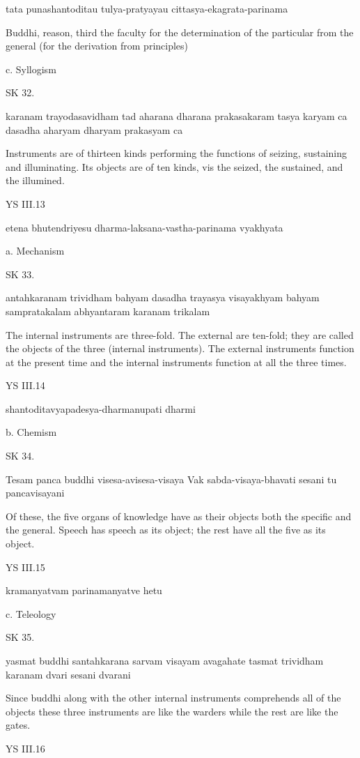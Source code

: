 tata punashantoditau tulya-pratyayau cittasya-ekagrata-parinama

Buddhi, reason, third the faculty for the determination of
the particular from the general (for the derivation from principles)

c. Syllogism

SK 32.

karanam trayodasavidham tad aharana dharana prakasakaram
tasya karyam ca dasadha aharyam dharyam prakasyam ca

Instruments are of thirteen kinds performing the functions of
seizing, sustaining and illuminating.
Its objects are of ten kinds, vis
the seized, the sustained, and the illumined.

YS III.13

etena bhutendriyesu dharma-laksana-vastha-parinama vyakhyata

a. Mechanism

SK 33.

antahkaranam trividham bahyam dasadha trayasya visayakhyam
bahyam sampratakalam abhyantaram karanam trikalam

The internal instruments are three-fold.
The external are ten-fold;
they are called the objects of the three (internal instruments).
The external instruments function at the present time and
the internal instruments function at all the three times.

YS III.14

shantoditavyapadesya-dharmanupati dharmi

b. Chemism

SK 34.

Tesam panca buddhi visesa-avisesa-visaya
Vak sabda-visaya-bhavati sesani tu pancavisayani

Of these, the five organs of knowledge have as their objects
both the specific and the general.
Speech has speech as its object;
the rest have all the five as its object.

YS III.15

kramanyatvam parinamanyatve hetu

c. Teleology

SK 35.

yasmat buddhi santahkarana sarvam visayam avagahate
tasmat trividham karanam dvari sesani dvarani

Since buddhi along with the other internal instruments
comprehends all of the objects these three instruments are
like the warders while the rest are like the gates.

YS III.16

